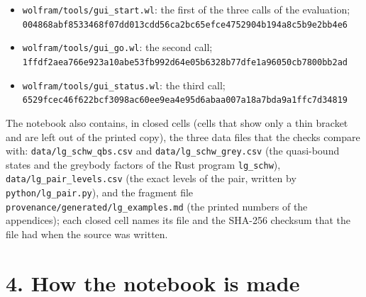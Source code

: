 \documentclass[
  10pt,
]{article}
\begin{document}
\begin{itemize}
  the front end, in a fresh kernel, with the log;\\
  \texttt{195f4bdc73d58df6546c9f18e16ef8ab08ced5e6891c09f62df075717a5bca4a}
\item
  \texttt{wolfram/tools/gui\_start.wl}: the first of the three calls of
  the evaluation;\\
  \texttt{004868abf8533468f07dd013cdd56ca2bc65efce4752904b194a8c5b9e2bb4e6}
\item
  \texttt{wolfram/tools/gui\_go.wl}: the second call;\\
  \texttt{1ffdf2aea766e923a10abe53fb992d64e05b6328b77dfe1a96050cb7800bb2ad}
\item
  \texttt{wolfram/tools/gui\_status.wl}: the third call;\\
  \texttt{6529fcec46f622bcf3098ac60ee9ea4e95d6abaa007a18a7bda9a1ffc7d34819}
\end{itemize}

The notebook also contains, in closed cells (cells that show only a thin
bracket and are left out of the printed copy), the three data files that
the checks compare with: \texttt{data/lg\_schw\_qbs.csv} and
\texttt{data/lg\_schw\_grey.csv} (the quasi-bound states and the
greybody factors of the Rust program \texttt{lg\_schw}),
\texttt{data/lg\_pair\_levels.csv} (the exact levels of the pair,
written by \texttt{python/lg\_pair.py}), and the fragment file
\texttt{provenance/generated/lg\_examples.md} (the printed numbers of
the appendices); each closed cell names its file and the SHA-256
checksum that the file had when the source was written.

\hypertarget{how-the-notebook-is-made}{%
\section{4. How the notebook is made}\label{how-the-notebook-is-made}}
\end{document}
